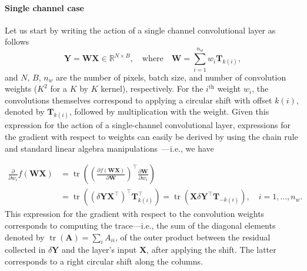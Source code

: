 \documentclass[10pt]{article}
\newcommand{\B}{\mathbf}
\begin{document}
\paragraph*{Single channel case}\label{single-channel}
Let us start by writing the action of a single channel convolutional layer as follows
\begin{equation}
  \B{Y} = \B{W}\B{X} \in \mathbb{R}^{N \times B}, \quad \text{where}\quad \B{W} = \sum_{i=1}^{n_w} w_i \B{T}_{k(i)},
\end{equation}
and $N,\, B,\, n_w$ are the number of pixels, batch size, and number of convolution weights ($K^2$ for a $K$ by $K$ kernel), respectively. For the $i^\text{th}$ weight $w_i$, the convolutions themselves correspond to applying a circular shift with offset $k(i)$, denoted by $\B{T}_{k(i)}$, followed by multiplication with the weight. Given this expression for the action of a single-channel convolutional layer, expressions for the gradient with respect to weights can easily be derived by using the chain rule and standard linear algebra manipulations~\citep{Petersen2008}---i.e., we have

\begin{equation}
\begin{aligned}
\frac{\partial }{\partial w_i} f(\B{W}\B{X}) &= \operatorname{tr}\left(\left(\frac{\partial f(\B{W}\B{X})}{\partial \B{W}}\right)^\top \frac{\partial \B{W}}{\partial w_i}\right)\\ & = \operatorname{tr}\left(\left(\delta \B{Y} \B{X}^\top\right)^\top \B{T}_{k(i)}^\top\right) = \operatorname{tr}\left(\B{X} \delta \B{Y}^\top \B{T}_{-k(i)}\right)
, \quad i=1,\ldots,n_w.
\end{aligned}
\label{dwtr}
\end{equation}
This expression for the gradient with respect to the convolution weights corresponds to computing the trace---i.e., the sum of the diagonal elements denoted by $\operatorname{tr}(\B{A})=\sum_i A_{ii}$, of the outer product between the residual collected in $\delta \B{Y}$ and the layer's input $\B{X}$, after applying the shift. The latter corresponds to a right circular shift along the columns.
\end{document}
